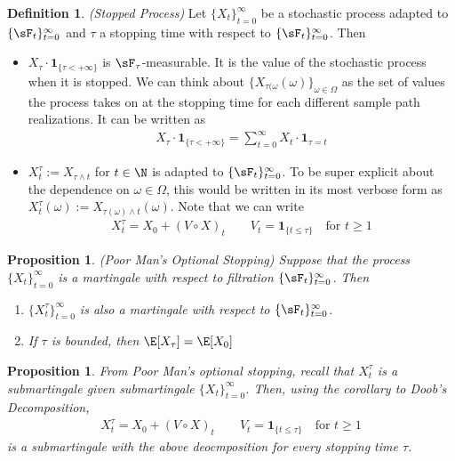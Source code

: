 \documentclass[12pt]{article}
\theoremstyle{plain}
\newtheorem{prop}[thm]{Proposition}
\theoremstyle{definition}
\newtheorem{defn}[thm]{Definition}
\theoremstyle{remark}
\newcommand{\one}[1]{\mathbf{1}_{#1}}
\newcommand{\sumtinfz}{\sum^\infty_{t=0}}
\newcommand{\tinfz}{_{t=0}^\infty}
\begin{document}
\begin{defn}\emph{(Stopped Process)}
Let $\{X_t\}\tinfz$ be a stochastic process adapted to
$\{\sF_t\}\tinfz$ and $\tau$ a stopping time with respect to
$\{\sF_t\}\tinfz$. Then
\begin{itemize}
  \item $X_\tau \cdot \one{\{\tau<+\infty\}}$ is $\sF_\tau$-measurable.
    It is the value of the stochastic process when it is stopped.
    We can think about $\{X_{\tau(\omega}(\omega)\}_{\omega\in\Omega}$
    as the set of values the process takes on at the stopping time for
    each different sample path realizations. It can be written as
    \begin{align*}
      X_\tau\cdot \one{\{\tau<+\infty\}}
      = \sumtinfz X_t \cdot \one{\tau=t}
    \end{align*}

  \item $X^\tau_t := X_{\tau \wedge t}$ for
    $t\in\N$ is adapted to $\{\sF_t\}\tinfz$.
    To be super explicit about the dependence on $\omega\in\Omega$, this
    would be written in its most verbose form as
    $X^\tau_t(\omega) := X_{\tau(\omega) \wedge t}(\omega)$. Note that
    we can write
    \begin{align*}
      X_t^\tau = X_0 + (V\circ X)_t
      \qquad V_t = \one{\{t\leq \tau\}}\quad\text{for $t\geq 1$}
    \end{align*}
\end{itemize}
\end{defn}


\begin{prop}\emph{(Poor Man's Optional Stopping)}
Suppose that the process $\{X_t\}\tinfz$ is a martingale with respect to
filtration $\{\sF_t\}\tinfz$. Then
\begin{enumerate}[label=\emph{(\roman*)}]
  \item $\{X^\tau_t\}\tinfz$ is also a martingale with respect to
    $\{\sF_t\}\tinfz$.
  \item If $\tau$ is bounded, then $\E[X_\tau] = \E[X_0]$
\end{enumerate}
\end{prop}


\begin{prop}
From Poor Man's optional stopping, recall that $X^\tau_t$ is a
submartingale given submartingale $\{X_t\}\tinfz$. Then, using the
corollary to Doob's Decomposition,
\begin{align*}
  X_t^\tau = X_0 + (V\circ X)_t
  \qquad V_t = \one{\{t\leq \tau\}}\quad\text{for $t\geq 1$}
\end{align*}
is a submartingale with the above deocmposition for every stopping time
$\tau$.
\end{prop}
\end{document}
